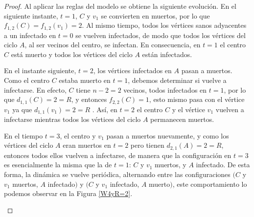 \documentclass[12pt,titlepage,twoside,openright]{book}
\begin{document}
\begin{proof}
    Al aplicar las reglas del modelo se obtiene la siguiente evoluci\'on. En el siguiente instante, $t=1$, $C$ y $v_1$ se convierten en muertos, por lo que $f_{1,2}(C)=f_{1,2}(v_1)=2$. Al mismo tiempo, todos los v\'ertices sanos adyacentes a un infectado en $t=0$ se vuelven infectados, de modo que todos los v\'ertices del ciclo $A$, al ser vecinos del centro, se infectan. En consecuencia, en $t=1$ el centro $C$ est\'a muerto y todos los v\'ertices del ciclo $A$ est\'an infectados. 
    
    En el instante siguiente, $t=2$, los v\'ertices infectados en $A$ pasan a muertos. Como el centro $C$ estaba muerto en $t=1$, debemos determinar si vuelve a infectarse. En efecto, $C$ tiene $n-2=2$ vecinos, todos infectados en $t=1$, por lo que $d_{1,1}(C)=2=R$, y entonces $f_{2,2}(C)=1$, esto mismo pasa con el v\'ertice $v_1$ ya que $d_{1,1}(v_1)=2=R$ . As\'i, en $t=2$ el centro $C$ y el v\'ertice $v_1$ vuelven a infectarse mientras todos los v\'ertices del ciclo $A$ permanecen muertos. 
    
    En el tiempo $t=3$, el centro y $v_1$ pasan a muertos nuevamente, y como los v\'ertices del ciclo $A$ eran muertos en $t=2$ pero tienen $d_{2,1}(A)=2=R$, entonces todos ellos vuelven a infectarse, de manera que la configuraci\'on en $t=3$ es esencialmente la misma que la de $t=1$: $C$ y $v_1$ muertos, y $A$ infectado. De esta forma, la din\'amica se vuelve peri\'odica, alternando entre las configuraciones $(C$ y $v_1$ muertos, $A$ infectado$)$ y $(C$ y $v_1$ infectado, $A$ muerto$)$, este comportamiento lo podemos observar en la Figura \ref{W4yR=2}.

    \begin{figure}[h]
    \centering
\end{figure}
\end{proof}
\end{document}

